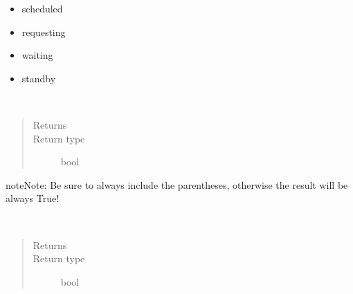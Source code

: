 \documentclass[letterpaper,10pt,english]{sphinxmanual}
\begin{document}
\begin{fulllineitems}
\begin{fulllineitems}
\begin{description}
\begin{itemize}
\item {} 
scheduled

\item {} 
requesting

\item {} 
waiting

\item {} 
standby

\end{itemize}

\end{description}

\end{fulllineitems}


\begin{fulllineitems}
\label{\detokenize{Reference:salabim.Component.iscurrent}}~\begin{quote}\begin{description}
\item[{Returns}] \leavevmode
{}

\item[{Return type}] \leavevmode
bool

\end{description}\end{quote}

\begin{sphinxadmonition}{note}{Note:}
Be sure to always include the parentheses, otherwise the result will be always True!
\end{sphinxadmonition}

\end{fulllineitems}


\begin{fulllineitems}
\label{\detokenize{Reference:salabim.Component.isdata}}~\begin{quote}\begin{description}
\item[{Returns}] \leavevmode
{}

\item[{Return type}] \leavevmode
bool

\end{description}\end{quote}


\end{fulllineitems}
\end{fulllineitems}
\end{document}
